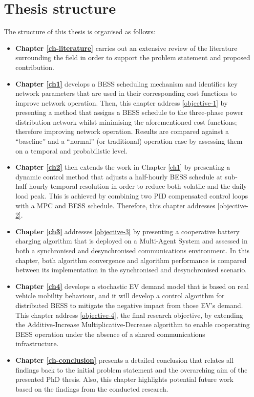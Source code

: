 \section{Thesis structure}
\label{ch-introduction:sec:thesis-structure}

The structure of this thesis is organised as follows:

\begin{itemize}
	\item
	\textbf{Chapter \ref{ch-literature}} carries out an extensive review of the literature surrounding the field in order to support the problem statement and proposed contribution.
	\item
	\textbf{Chapter \ref{ch1}} develops a BESS scheduling mechanism and identifies key network parameters that are used in their corresponding cost functions to improve network operation.
	Then, this chapter address \ref{objective-1} by presenting a method that assigns a BESS schedule to the three-phase power distribution network whilst minimising the aforementioned cost functions; therefore improving network operation.
	Results are compared against a ``baseline'' and a ``normal'' (or traditional) operation case by assessing them on a temporal and probabilistic level.
	\item
	\textbf{Chapter \ref{ch2}} then extends the work in Chapter \ref{ch1} by presenting a dynamic control method that adjusts a half-hourly BESS schedule at sub-half-hourly temporal resolution in order to reduce both volatile and the daily load peak.
	This is achieved by combining two PID compensated control loops with a MPC and BESS schedule.
	Therefore, this chapter addresses \ref{objective-2}.
	\item
	\textbf{Chapter \ref{ch3}} addresses \ref{objective-3} by presenting a cooperative battery charging algorithm that is deployed on a Multi-Agent System and assessed in both a synchronised and desynchronised communications environment.
	In this chapter, both algorithm convergence and algorithm performance is compared between its implementation in the synchronised and desynchronised scenario.
	\item
	\textbf{Chapter \ref{ch4}} develops a stochastic EV demand model that is based on real vehicle mobility behaviour, and it will develop a control algorithm for distributed BESS to mitigate the negative impact from those EV's demand.
	This chapter address \ref{objective-4}, the final research objective, by extending the Additive-Increase Multiplicative-Decrease algorithm to enable cooperating BESS operation under the absence of a shared communications infrastructure.
	\item
	\textbf{Chapter \ref{ch-conclusion}} presents a detailed conclusion that relates all findings back to the initial problem statement and the overarching aim of the presented PhD thesis.
	Also, this chapter highlights potential future work based on the findings from the conducted research.
\end{itemize}